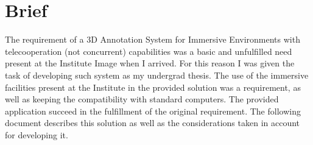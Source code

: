 \chapter{Brief}
The requirement of a 3D Annotation System for Immersive Environments with telecooperation (not concurrent) capabilities was a basic and unfulfilled need present at the Institute Image when I arrived. For this reason I was given the task of developing such system as my undergrad thesis. The use of the immersive facilities present at the Institute in the provided solution was a requirement, as well as keeping the compatibility with standard computers. The provided application succeed in the fulfillment of the original requirement. The following document describes this solution as well as the considerations taken in account for developing it.